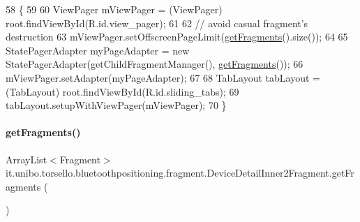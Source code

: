 \begin{DoxyCode}
58                                              \{
59 
60         ViewPager mViewPager = (ViewPager) root.findViewById(R.id.view\_pager);
61 
62         \textcolor{comment}{// avoid casual fragment's destruction}
63         mViewPager.setOffscreenPageLimit(\hyperlink{classit_1_1unibo_1_1torsello_1_1bluetoothpositioning_1_1fragment_1_1DeviceDetailInner2Fragment_a74ebcb936381919cfe4f3542585203c4_a74ebcb936381919cfe4f3542585203c4}{getFragments}().size());
64 
65         StatePagerAdapter myPageAdapter = \textcolor{keyword}{new} StatePagerAdapter(getChildFragmentManager(), 
      \hyperlink{classit_1_1unibo_1_1torsello_1_1bluetoothpositioning_1_1fragment_1_1DeviceDetailInner2Fragment_a74ebcb936381919cfe4f3542585203c4_a74ebcb936381919cfe4f3542585203c4}{getFragments}());
66         mViewPager.setAdapter(myPageAdapter);
67 
68         TabLayout tabLayout = (TabLayout) root.findViewById(R.id.sliding\_tabs);
69         tabLayout.setupWithViewPager(mViewPager);
70     \}
\end{DoxyCode}
\hypertarget{classit_1_1unibo_1_1torsello_1_1bluetoothpositioning_1_1fragment_1_1DeviceDetailInner2Fragment_a74ebcb936381919cfe4f3542585203c4_a74ebcb936381919cfe4f3542585203c4}{}\label{classit_1_1unibo_1_1torsello_1_1bluetoothpositioning_1_1fragment_1_1DeviceDetailInner2Fragment_a74ebcb936381919cfe4f3542585203c4_a74ebcb936381919cfe4f3542585203c4} 
\paragraph{\texorpdfstring{get\+Fragments()}{getFragments()}}
{\footnotesize\ttfamily Array\+List$<$Fragment$>$ it.\+unibo.\+torsello.\+bluetoothpositioning.\+fragment.\+Device\+Detail\+Inner2\+Fragment.\+get\+Fragments (\begin{DoxyParamCaption}{ }\end{DoxyParamCaption})\hspace{0.3cm}{\ttfamily [private]}}


